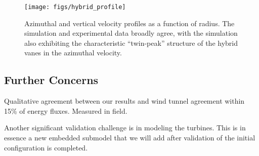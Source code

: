   \begin{figure}[!htb]
    \begin{center}
     \texttt{[image: figs/hybrid\_profile]}
     \caption{Azimuthal and vertical velocity profiles as a function of
     radius. The simulation and experimental data broadly agree, with
     the simulation also exhibiting the characteristic ``twin-peak''
     structure of the hybrid vanes in the azimuthal velocity. }
     \label{fig:lab}
    \end{center}
  \end{figure}

%
%
%

\subsection{Further Concerns}
%
%
Qualitative agreement between our results and wind tunnel agreement
within 15\% of energy fluxes. Measured in field. 
%


%
%

Another significant validation challenge is in modeling the
turbines. This is in essence a new embedded 
submodel that we will add after validation of the initial configuration
is completed. 
